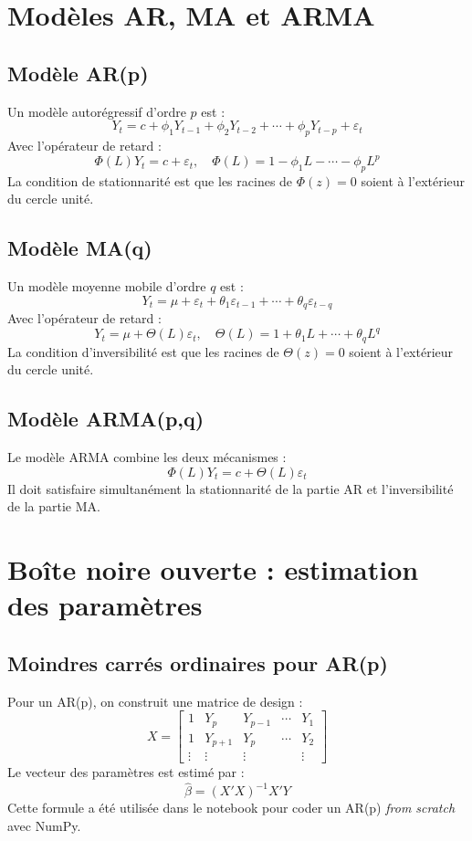 \documentclass[12pt,a4paper]{report}
\begin{document}
\section{Modèles AR, MA et ARMA}
\subsection{Modèle AR(p)}
Un modèle autorégressif d'ordre $p$ est :
\[
Y_t = c + \phi_1Y_{t-1} + \phi_2Y_{t-2} + \cdots + \phi_pY_{t-p} + \varepsilon_t
\]
Avec l'opérateur de retard :
\[
\Phi(L)Y_t = c + \varepsilon_t, \quad \Phi(L)=1-\phi_1L-\cdots-\phi_pL^p
\]
La condition de stationnarité est que les racines de $\Phi(z)=0$ soient à l'extérieur du cercle unité.

\subsection{Modèle MA(q)}
Un modèle moyenne mobile d'ordre $q$ est :
\[
Y_t = \mu + \varepsilon_t + \theta_1\varepsilon_{t-1} + \cdots + \theta_q\varepsilon_{t-q}
\]
Avec l'opérateur de retard :
\[
Y_t = \mu + \Theta(L)\varepsilon_t, \quad \Theta(L)=1+\theta_1L+\cdots+\theta_qL^q
\]
La condition d'inversibilité est que les racines de $\Theta(z)=0$ soient à l'extérieur du cercle unité.

\subsection{Modèle ARMA(p,q)}
Le modèle ARMA combine les deux mécanismes :
\[
\Phi(L)Y_t = c + \Theta(L)\varepsilon_t
\]
Il doit satisfaire simultanément la stationnarité de la partie AR et l'inversibilité de la partie MA.

\section{Boîte noire ouverte : estimation des paramètres}
\subsection{Moindres carrés ordinaires pour AR(p)}
Pour un AR(p), on construit une matrice de design :
\[
X = \begin{bmatrix}
1 & Y_p & Y_{p-1} & \cdots & Y_1 \\
1 & Y_{p+1} & Y_p & \cdots & Y_2 \\
\vdots & \vdots & \vdots & & \vdots
\end{bmatrix}
\]
Le vecteur des paramètres est estimé par :
\[
\hat{\beta} = (X'X)^{-1}X'Y
\]
Cette formule a été utilisée dans le notebook pour coder un AR(p) \textit{from scratch} avec NumPy.
\end{document}
